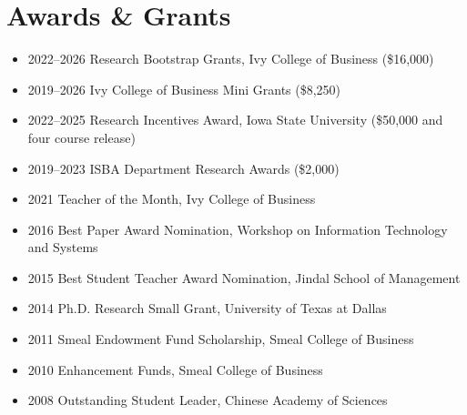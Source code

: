 \documentclass[paper=letter,fontsize=10pt]{scrartcl} %
\newcommand{\NewPart}[2]{\section*{{#1} #2}}
\begin{document}
\NewPart{Awards \& Grants}{}
\begin{itemize}
\item 2022--2026 \hspace{0.3em} Research Bootstrap Grants, Ivy College of Business (\$16,000)
\item 2019--2026 \hspace{0.3em} Ivy College of Business Mini Grants (\$8,250)
\item 2022--2025 \hspace{0.3em} Research Incentives Award, Iowa State University (\$50,000 and four course release)
\item 2019--2023 \hspace{0.3em} ISBA Department Research Awards (\$2,000)
\item 2021 \hspace{0.3em} Teacher of the Month, Ivy College of Business
\item 2016 \hspace{0.3em} Best Paper Award Nomination, Workshop on Information Technology and Systems
\item 2015 \hspace{0.3em} Best Student Teacher Award Nomination, Jindal School of Management
\item 2014 \hspace{0.3em} Ph.D. Research Small Grant, University of Texas at Dallas
\item 2011 \hspace{0.3em} Smeal Endowment Fund Scholarship, Smeal College of Business
\item 2010 \hspace{0.3em} Enhancement Funds, Smeal College of Business
\item 2008 \hspace{0.3em} Outstanding Student Leader, Chinese Academy of Sciences
\end{itemize}

\end{document}
